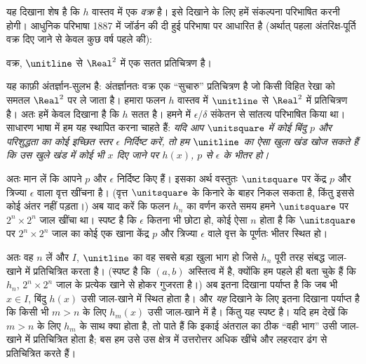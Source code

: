 \documentclass[../../../include/open-logic-section]{subfiles}
\begin{document}
यह दिखाना शेष है कि $h$ वास्तव में एक \emph{वक्र} है। इसे दिखाने के लिए हमें
संकल्पना परिभाषित करनी होगी। आधुनिक परिभाषा 1887 में जॉर्डन की दी हुई परिभाषा
पर आधारित है (अर्थात् पहला अंतरिक्ष-पूर्ति वक्र दिए जाने से केवल कुछ वर्ष
पहले की):

\begin{defn}
वक्र, $\unitline$ से $\Real^2$ में एक सतत प्रतिचित्रण है।
\end{defn}

यह काफ़ी अंतर्ज्ञान-सुलभ है: अंतर्ज्ञानतः वक्र एक ``सुचारु'' प्रतिचित्रण है
जो किसी विहित रेखा को समतल $\Real^2$ पर ले जाता है। हमारा फलन $h$ वास्तव में
$\unitline$ से $\Real^2$ में प्रतिचित्रण है। अतः हमें केवल दिखाना है कि $h$
सतत है। हमने  में $\epsilon$/$\delta$ संकेतन से सांतत्य
परिभाषित किया था। साधारण भाषा में हम यह स्थापित करना चाहते हैं:
\emph{यदि आप $\unitsquare$ में कोई बिंदु $p$ और परिशुद्धता का कोई इच्छित
स्तर $\epsilon$ निर्दिष्ट करें, तो हम $\unitline$ का ऐसा खुला खंड खोज सकते
हैं कि उस खुले खंड में कोई भी $x$ दिए जाने पर $h(x)$, $p$ से $\epsilon$ के
भीतर हो।}

अतः मान लें कि आपने $p$ और $\epsilon$ निर्दिष्ट किए हैं। इसका अर्थ वस्तुतः
$\unitsquare$ पर केंद्र $p$ और त्रिज्या $\epsilon$ वाला वृत्त खींचना है।
(वृत्त $\unitsquare$ के किनारे के बाहर निकल सकता है, किंतु इससे कोई अंतर
नहीं पड़ता।) अब याद करें कि फलन $h_n$ का वर्णन करते समय हमने $\unitsquare$
पर $2^n \times 2^n$ जाल खींचा था। स्पष्ट है कि $\epsilon$ कितना भी छोटा हो,
कोई ऐसा $n$ होता है कि $\unitsquare$ पर $2^n \times 2^n$ जाल का कोई एक खाना
केंद्र $p$ और त्रिज्या $\epsilon$ वाले वृत्त के पूर्णतः भीतर स्थित हो।

अतः वह $n$ लें और $I$, $\unitline$ का वह सबसे बड़ा खुला भाग हो जिसे $h_n$
पूरी तरह संबद्ध जाल-खाने में प्रतिचित्रित करता है। (स्पष्ट है कि $(a,b)$
अस्तित्व में है, क्योंकि हम पहले ही बता चुके हैं कि $h_n$, $2^n\times 2^n$
जाल के प्रत्येक खाने से होकर गुजरता है।) अब इतना दिखाना पर्याप्त है कि जब
भी $x \in I$, बिंदु $h(x)$ उसी जाल-खाने में स्थित होता है। और \emph{यह}
दिखाने के लिए इतना दिखाना पर्याप्त है कि किसी भी $m > n$ के लिए $h_m(x)$
उसी जाल-खाने में है। किंतु यह स्पष्ट है। यदि हम देखें कि $m > n$ के लिए
$h_m$ के साथ क्या होता है, तो पाते हैं कि इकाई अंतराल का ठीक ``वही भाग'' उसी
जाल-खाने में प्रतिचित्रित होता है; बस हम उसे उस क्षेत्र में उत्तरोत्तर अधिक
खींचे और लहरदार ढंग से प्रतिचित्रित करते हैं।
\end{document}
